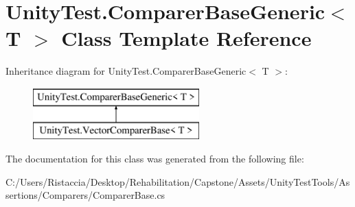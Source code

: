 \hypertarget{class_unity_test_1_1_comparer_base_generic}{}\section{Unity\+Test.\+Comparer\+Base\+Generic$<$ T $>$ Class Template Reference}
\label{class_unity_test_1_1_comparer_base_generic}
Inheritance diagram for Unity\+Test.\+Comparer\+Base\+Generic$<$ T $>$\+:\begin{figure}[H]
\begin{center}
\leavevmode
\includegraphics[height=2.000000cm]{class_unity_test_1_1_comparer_base_generic}
\end{center}
\end{figure}


The documentation for this class was generated from the following file\+:\begin{DoxyCompactItemize}
\item 
C\+:/\+Users/\+Ristaccia/\+Desktop/\+Rehabilitation/\+Capstone/\+Assets/\+Unity\+Test\+Tools/\+Assertions/\+Comparers/Comparer\+Base.\+cs\end{DoxyCompactItemize}
